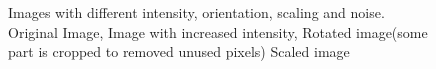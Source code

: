 \begin{figure}[H]
\begin{center}
	
\end{center}
\caption[Test Images to Evaluate for Feature Extractors]{Images with different intensity, orientation, scaling and noise. Original Image, Image with increased intensity, Rotated image(some part is cropped to removed unused pixels) Scaled image}%
\end{figure}
\newpage 
